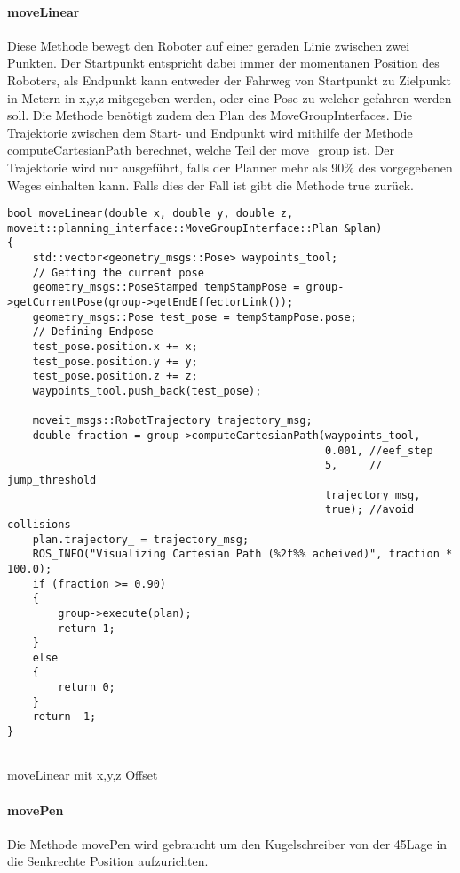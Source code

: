 \paragraph{moveLinear}
Diese Methode bewegt den Roboter auf einer geraden Linie zwischen zwei Punkten. Der Startpunkt entspricht dabei immer der momentanen Position des Roboters, als Endpunkt kann entweder der Fahrweg von Startpunkt zu Zielpunkt in Metern in x,y,z mitgegeben werden, oder eine Pose zu welcher gefahren werden soll. Die Methode benötigt zudem den Plan des MoveGroupInterfaces.
Die Trajektorie zwischen dem Start- und Endpunkt wird mithilfe der Methode computeCartesianPath berechnet, welche Teil der move\_group ist. Der Trajektorie wird nur ausgeführt, falls der Planner mehr als 90\;\% des vorgegebenen Weges einhalten kann. Falls dies der Fall ist gibt die Methode true zurück.
\begin{code}
	\begin{verbatim}
bool moveLinear(double x, double y, double z, moveit::planning_interface::MoveGroupInterface::Plan &plan)
{
    std::vector<geometry_msgs::Pose> waypoints_tool;
    // Getting the current pose
    geometry_msgs::PoseStamped tempStampPose = group->getCurrentPose(group->getEndEffectorLink());
    geometry_msgs::Pose test_pose = tempStampPose.pose;
	// Defining Endpose
    test_pose.position.x += x;
    test_pose.position.y += y;
    test_pose.position.z += z;
    waypoints_tool.push_back(test_pose);

    moveit_msgs::RobotTrajectory trajectory_msg;
    double fraction = group->computeCartesianPath(waypoints_tool,
                                                  0.001, //eef_step
                                                  5,     // jump_threshold
                                                  trajectory_msg, 
                                                  true); //avoid collisions
    plan.trajectory_ = trajectory_msg;
    ROS_INFO("Visualizing Cartesian Path (%2f%% acheived)", fraction * 100.0);
    if (fraction >= 0.90)
    {
        group->execute(plan);
        return 1;
    }
    else
    {
        return 0;
    }
    return -1;
}
	
	\end{verbatim}
	\vspace{-10pt}
	\caption{moveLinear mit x,y,z Offset}
	\label{code:moveLinear}
\end{code}

\paragraph{movePen}
Die Methode movePen wird gebraucht um den Kugelschreiber von der 45\;\textdegree Lage in die Senkrechte Position aufzurichten. 

